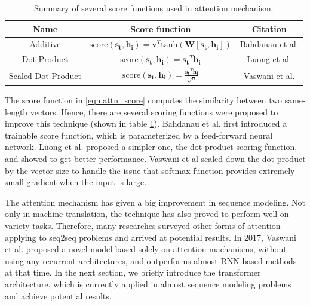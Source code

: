 \begin{table}[h]
\centering
\caption{Summary of several score functions used in attention mechanism. }
\footnotesize
\begin{tabular}{ c | c | c  }
\hline
\textbf{Name} & \textbf{Score function} & \textbf{Citation} \\
\hline
Additive & $ \mathrm{score}(\mathbf{s_t}, \mathbf{h_i}) = \mathbf{v}^T \mathrm{tanh}(\mathbf{W}[\mathbf{s_t}, \mathbf{h_i}])$  & 	Bahdanau et al. \cite{bahdanau2014neural}  \\
Dot-Product &  $\mathrm{score}(\mathbf{s_t}, \mathbf{h_i}) = \mathbf{s_t}^T \mathbf{h_i}$ & Luong et al. \cite{luong2015effective} \\ 
Scaled Dot-Product & $\mathrm{score}(\mathbf{s_t}, \mathbf{h_i}) = \frac{\mathbf{s_t}^T \mathbf{h_i}}{\sqrt{n}} $ & Vaswani et al.\cite{vaswani2017attention} \\
\hline
\end{tabular}
\label{table:attn_score}
\end{table}
The $\mathrm{score}$ function in \ref{eqn:attn_score} computes the similarity between two same-length vectors. Hence, there are several scoring functions were proposed to improve this technique (shown in table \ref{table:attn_score}). Bahdanau et al.\cite{bahdanau2014neural} first introduced a trainable score function, which is parameterized by a feed-forward neural network. Luong et al.\cite{luong2015effective} proposed a simpler one, the dot-product scoring function, and showed to get better performance. Vaswani et al scaled down the dot-product by the vector size to handle the issue that softmax function provides extremely small gradient when the input is large.

The attention mechanism has given a big improvement in sequence modeling. Not only in machine translation, the technique has also proved to perform well on variety tasks. 
Therefore, many researches surveyed other forms of attention applying to seq2seq problems and arrived at potential results.
In 2017, Vaswani et al.\cite{vaswani2017attention} proposed a novel model based solely on attention machanisms, without using any recurrent architectures, and outperforms almost RNN-based methods at that time. In the next section, we briefly introduce the transformer architecture, which is currently applied in almost sequence modeling problems and achieve potential results.

